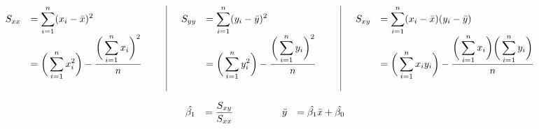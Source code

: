 \documentclass{article}
\begin{document}
\begin{equation*}
	\hspace*{-0.35cm}
	\begin{array}{rll |  rll  |   ll}
        S_{xx} 	& 	= \displaystyle\sum\limits_{i=1}^n (x_{i} - \bar{x})^{2}  
        			& 	\quad	&	\quad 
	S_{yy} 	& = \displaystyle\sum\limits_{i=1}^n (y_{i} - \bar{y})^{2}  
			& 	\quad 	&	\quad 
	S_{xy} 	& = \displaystyle\sum\limits_{i=1}^n (x_{i} - \bar{x})(y_{i} - \bar{y})\\
        		 	& =  \bigg( \displaystyle\sum\limits_{i=1}^n x_{i}^{2} \bigg) -  \frac{ \bigg( \displaystyle\sum\limits_{i=1}^n x_{i} \bigg)^{2} }{n}
			& 	\quad	&	\quad 
			& =  \bigg( \displaystyle\sum\limits_{i=1}^n y_{i}^{2} \bigg) -  \frac{ \bigg( \displaystyle\sum\limits_{i=1}^n y_{i} \bigg)^{2} }{n}
			& 	\quad	&	\quad 
			& =  \bigg( \displaystyle\sum\limits_{i=1}^n x_{i} y_{i} \bigg) -  \frac{ \bigg( \displaystyle\sum\limits_{i=1}^n x_{i} \bigg) 
																\bigg( \displaystyle\sum\limits_{i=1}^n y_{i} \bigg)}{n}	\\
			&	&	&	&	&	\\
    \end{array}
\end{equation*}


\smallskip
\smallskip

\begin{equation*}
    \begin{array}{rll  rlllllllll}
        \hat{\beta_{1}}  & = \displaystyle\frac{S_{xy}}{S_{xx}}   & \quad \quad\quad &    \bar{y}    & =\hat{\beta_{1}} \bar{x} + \hat{\beta_{0}}   
        & &\\
    \end{array}
\end{equation*}
\end{document}
